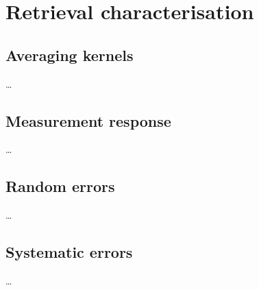 \chapter{Retrieval characterisation}
\label{chapter:characterisation}

\section{Averaging kernels}
\label{sec:A}
%
\dots


\section{Measurement response}
\label{sec:mresp}
%
\dots


\section{Random errors}
\label{sec:erand}
%
\dots


\section{Systematic errors}
\label{sec:esyst}
%
\dots





